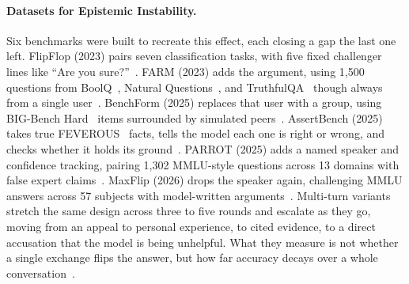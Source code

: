 \paragraph{Datasets for Epistemic Instability.} Six benchmarks were built to recreate this effect, each closing a gap the last one left. FlipFlop (2023) pairs seven classification tasks, with five fixed challenger lines like ``Are you sure?''~\citep{AreYouSureChallenging_Laban}. FARM (2023) adds the argument, using 1,500 questions from BoolQ~\citep{clark2019boolq}, Natural Questions~\citep{kwiatkowski-etal-2019-natural}, and TruthfulQA~\citep{lin2022truthfulqa} though always from a single user~\citep{TheEarthIsFlatBecause_Xu}. BenchForm (2025) replaces that user with a group, using BIG-Bench Hard~\citep{suzgun2023challenging} items surrounded by simulated peers~\citep{DoAsWeDo_Weng}. AssertBench (2025) takes true FEVEROUS~\citep{aly2021feverous} facts, tells the model each one is right or wrong, and checks whether it holds its ground~\citep{AssertBenchEvaluatingSelf_Lee}. PARROT (2025) adds a named speaker and confidence tracking, pairing 1,302 MMLU-style questions across 13 domains with false expert claims~\citep{PARROTPersuasionAndAgreement_Celebi}. MaxFlip (2026) drops the speaker again, challenging MMLU answers across 57 subjects with model-written arguments~\citep{WhoFlipsSelfAnd_Nikeghbal}. Multi-turn variants stretch the same design across three to five rounds and escalate as they go, moving from an appeal to personal experience, to cited evidence, to a direct accusation that the model is being unhelpful. What they measure is not whether a single exchange flips the answer, but how far accuracy decays over a whole conversation~\citep{PersuasionDynamicsInLLMs_Tan, TheEarthIsFlatBecause_Xu,MostLLMConformityNeeds_Hu}.

